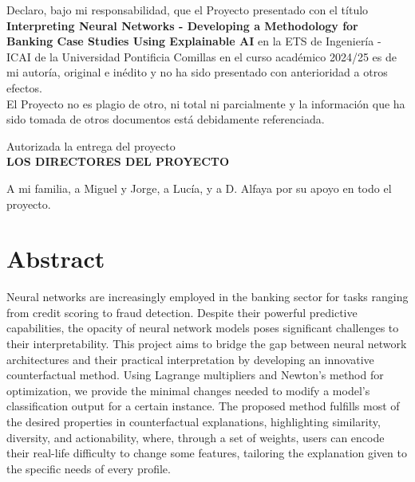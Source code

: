 \documentclass[12pt]{extarticle}
\numberwithin{equation}{section}
\begin{document}
\newpage

{\fontsize{14}{18}\selectfont
    Declaro, bajo mi responsabilidad, que el Proyecto presentado con el título \textbf{Interpreting Neural Networks - Developing a Methodology for Banking Case Studies Using Explainable AI} en la ETS de Ingeniería - ICAI de la Universidad Pontificia Comillas en el curso académico 2024/25 es de mi autoría, original e inédito y no ha sido presentado con anterioridad a otros efectos. \\
    
    El Proyecto no es plagio de otro, ni total ni parcialmente y la información que ha sido tomada de otros documentos está debidamente referenciada.
    
    \vspace{2cm}
    

    
    \vspace{2cm}
    
    \begin{center}
        Autorizada la entrega del proyecto \\
        \vspace{1cm}
        \textbf{LOS DIRECTORES DEL PROYECTO}
    \end{center}
    
    \vspace{1cm}
    
}

\newpage

{\fontsize{17}{20}
    \begin{center}
        {\large A mi familia, a Miguel y Jorge, a Lucía, y a D. Alfaya por su apoyo en todo el proyecto.}
        
    \end{center}
}

\newpage
\section*{Abstract}
Neural networks are increasingly employed in the banking sector for tasks ranging from credit scoring to fraud detection. Despite their powerful predictive capabilities, the opacity of neural network models poses significant challenges to their interpretability. This project aims to bridge the gap between neural network architectures and their practical interpretation by developing an innovative counterfactual method. Using Lagrange multipliers and Newton's method for optimization, we provide the minimal changes needed to modify a model's classification output for a certain instance. The proposed method fulfills most of the desired properties in counterfactual explanations, highlighting similarity, diversity, and actionability, where, through a set of weights, users can encode their real-life difficulty to change some features, tailoring the explanation given to the specific needs of every profile.
\end{document}
